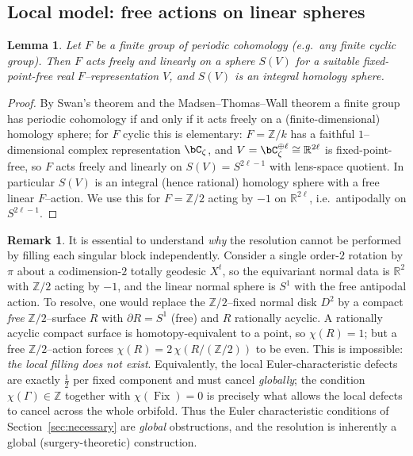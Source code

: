\documentclass[12pt]{article}
\newcommand{\bR}{\mathbb{R}}
\newcommand{\bZ}{\mathbb{Z}}
\newcommand{\Fix}{\operatorname{Fix}}
\newtheorem{lemma}{Lemma}
\theoremstyle{definition}
\newtheorem{remark}{Remark}
\begin{document}
\subsection{Local model: free actions on linear spheres}

\begin{lemma}\label{lem:cyclicfree}
Let $F$ be a finite group of \emph{periodic cohomology} (e.g.\ any finite cyclic
group).  Then $F$ acts freely and linearly on a sphere $S(V)$ for a suitable
fixed-point-free real $F$--representation $V$, and $S(V)$ is an integral homology
sphere.
\end{lemma}

\begin{proof}
By Swan's theorem and the Madsen--Thomas--Wall theorem a finite group has
periodic cohomology if and only if it acts freely on a (finite-dimensional)
homology sphere; for $F$ cyclic this is elementary: $F=\bZ/k$ has a faithful
$1$--dimensional complex representation $\bC_\zeta$, and
$V=\bC_\zeta^{\oplus\ell}\cong\bR^{2\ell}$ is fixed-point-free, so $F$ acts freely
and linearly on $S(V)=S^{2\ell-1}$ with lens-space quotient.  In particular
$S(V)$ is an integral (hence rational) homology sphere with a free linear
$F$--action.  We use this for $F=\bZ/2$ acting by $-1$ on $\bR^{2\ell}$, i.e.\
antipodally on $S^{2\ell-1}$.
\end{proof}

\begin{remark}\label{rem:nolocalfill}
It is essential to understand \emph{why} the resolution cannot be performed by
filling each singular block independently.  Consider a single order-$2$ rotation
by $\pi$ about a codimension-$2$ totally geodesic $X^{t}$, so the equivariant
normal data is $\bR^2$ with $\bZ/2$ acting by $-1$, and the linear normal sphere
is $S^1$ with the free antipodal action.  To resolve, one would replace the
$\bZ/2$--fixed normal disk $D^2$ by a compact \emph{free} $\bZ/2$--surface $R$
with $\partial R=S^1$ (free) and $R$ rationally acyclic.  A rationally acyclic
compact surface is homotopy-equivalent to a point, so $\chi(R)=1$; but a free
$\bZ/2$--action forces $\chi(R)=2\,\chi(R/(\bZ/2))$ to be even.  This is
impossible: \emph{the local filling does not exist}.  Equivalently, the local
Euler-characteristic defects are exactly $\tfrac12$ per fixed component and must
cancel \emph{globally}; the condition $\chi(\Gamma)\in\bZ$ together with
$\chi(\Fix)=0$ is precisely what allows the local defects to cancel across the
whole orbifold.  Thus the Euler characteristic conditions of
Section~\ref{sec:necessary} are \emph{global} obstructions, and the resolution is
inherently a global (surgery-theoretic) construction.
\end{remark}
\end{document}
